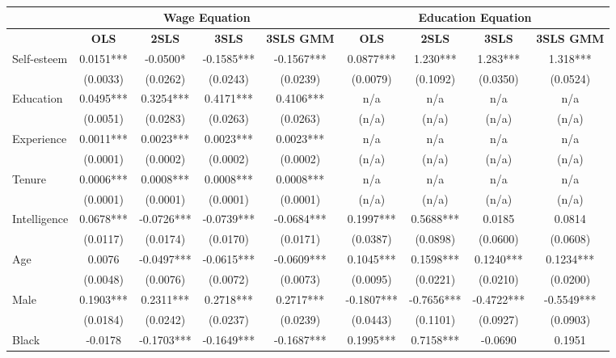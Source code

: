 \documentclass[12pt]{report}
\newcommand{\prbf}[1]{\textbf{#1}}
\begin{document}
\newpage
\begin{sidewaystable}
\small
\caption{\label{tab:wage87d}}
\vspace{2pt}
\centering\begin{tabular}{lc|c|c|c|c|c|c|c}
\hline
\hline
& \multicolumn{4}{|c|}{Wage Equation} & \multicolumn{4}{|c}{Education Equation}\\
\hline
& \prbf{OLS} & \prbf{2SLS} & \prbf{3SLS} & \prbf{3SLS GMM} & \prbf{OLS} & \prbf{2SLS} & \prbf{3SLS} & \prbf{3SLS GMM}\\
\hline
Self-esteem & 0.0151*** & -0.0500* & -0.1585*** & -0.1567*** & 0.0877*** & 1.230*** & 1.283*** & 1.318***\\
& (0.0033) & (0.0262) & (0.0243) & (0.0239) & (0.0079) & (0.1092) & (0.0350) & (0.0524)\\
Education & 0.0495*** & 0.3254*** & 0.4171*** & 0.4106*** & n/a & n/a & n/a & n/a \\
& (0.0051) & (0.0283) & (0.0263) & (0.0263) & (n/a) & (n/a) & (n/a) & (n/a)\\
Experience & 0.0011*** & 0.0023*** & 0.0023*** & 0.0023*** & n/a & n/a & n/a & n/a\\
& (0.0001) & (0.0002) & (0.0002) & (0.0002) & (n/a) & (n/a) & (n/a) & (n/a)\\
Tenure & 0.0006*** & 0.0008*** & 0.0008*** & 0.0008*** & n/a & n/a & n/a & n/a\\
& (0.0001) & (0.0001) & (0.0001) & (0.0001) & (n/a) & (n/a) & (n/a) & (n/a)\\
Intelligence & 0.0678*** & -0.0726*** & -0.0739*** & -0.0684*** & 0.1997*** & 0.5688*** & 0.0185 & 0.0814\\
& (0.0117) & (0.0174) & (0.0170) & (0.0171) & (0.0387) & (0.0898) & (0.0600) & (0.0608)\\
Age & 0.0076 & -0.0497*** & -0.0615*** & -0.0609*** & 0.1045*** & 0.1598*** & 0.1240*** & 0.1234***\\
& (0.0048) & (0.0076) & (0.0072) & (0.0073) & (0.0095) & (0.0221) & (0.0210) & (0.0200)\\
Male & 0.1903*** & 0.2311*** & 0.2718*** & 0.2717*** & -0.1807*** & -0.7656*** & -0.4722*** & -0.5549***\\
& (0.0184) & (0.0242) & (0.0237) & (0.0239) & (0.0443) & (0.1101) & (0.0927) & (0.0903)\\
Black & -0.0178 & -0.1703*** & -0.1649*** & -0.1687*** & 0.1995*** & 0.7158*** & -0.0690 & 0.1951\\

\end{tabular}
\end{sidewaystable}
\end{document}
